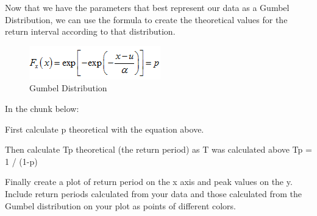 \documentclass[
]{book}
\newenvironment{Shaded}{\begin{snugshade}}{\end{snugshade}}
\newcommand{\DecValTok}[1]{\textcolor[rgb]{0.00,0.00,0.81}{#1}}
\newcommand{\FloatTok}[1]{\textcolor[rgb]{0.00,0.00,0.81}{#1}}
\newcommand{\FunctionTok}[1]{\textcolor[rgb]{0.00,0.00,0.00}{#1}}
\newcommand{\NormalTok}[1]{#1}
\newcommand{\OtherTok}[1]{\textcolor[rgb]{0.56,0.35,0.01}{#1}}
\newcommand{\SpecialCharTok}[1]{\textcolor[rgb]{0.00,0.00,0.00}{#1}}
\begin{document}
\begin{Shaded}
\end{Shaded}

Now that we have the parameters that best represent our data as a Gumbel Distribution, we can use the formula to create the theoretical values for the return interval according to that distribution.

\begin{figure}
\centering
\includegraphics{images/gumbel.png}
\caption{Gumbel Distribution}
\end{figure}

In the chunk below:

First calculate p theoretical with the equation above.

Then calculate Tp theoretical (the return period) as T was calculated above Tp = 1 / (1-p)

Finally create a plot of return period on the x axis and peak values on the y. Include return periods calculated from your data and those calculated from the Gumbel distribution on your plot as points of different colors.
\end{document}
